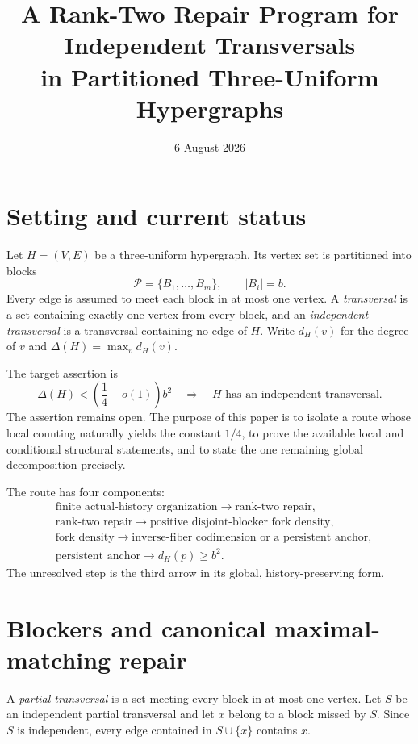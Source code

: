 \documentclass[11pt]{article}
\title{A Rank-Two Repair Program for Independent Transversals\\
       in Partitioned Three-Uniform Hypergraphs}
\author{}
\date{6 August 2026}
\newcommand{\cP}{\mathcal P}
\begin{document}
\maketitle

\section{Setting and current status}

Let \(H=(V,E)\) be a three-uniform hypergraph.  Its vertex set is partitioned
into blocks
\[
  \cP=\{B_1,\dots,B_m\},
  \qquad |B_i|=b.
\]
Every edge is assumed to meet each block in at most one vertex.  A
\emph{transversal} is a set containing exactly one vertex from every block, and
an \emph{independent transversal} is a transversal containing no edge of
\(H\).  Write \(d_H(v)\) for the degree of \(v\) and
\(\Delta(H)=\max_v d_H(v)\).

The target assertion is
\begin{equation}\label{eq:target}
  \Delta(H)<\left(\frac14-o(1)\right)b^2
  \quad\Longrightarrow\quad
  H\text{ has an independent transversal}.
\end{equation}
The assertion remains open.  The purpose of this paper is to isolate a route
whose local counting naturally yields the constant \(1/4\), to prove the
available local and conditional structural statements, and to state the one
remaining global decomposition precisely.

The route has four components:
\[
\boxed{
\begin{aligned}
&\text{finite actual-history organization}\longrightarrow
  \text{rank-two repair},\\
&\text{rank-two repair}\longrightarrow
  \text{positive disjoint-blocker fork density},\\
&\text{fork density}\longrightarrow
  \text{inverse-fiber codimension or a persistent anchor},\\
&\text{persistent anchor}\longrightarrow d_H(p)\ge b^2.
\end{aligned}}
\]
The unresolved step is the third arrow in its global, history-preserving form.

\section{Blockers and canonical maximal-matching repair}

A \emph{partial transversal} is a set meeting every block in at most one
vertex.  Let \(S\) be an independent partial transversal and let \(x\) belong
to a block missed by \(S\).  Since \(S\) is independent, every edge contained
in \(S\cup\{x\}\) contains \(x\).
\end{document}
